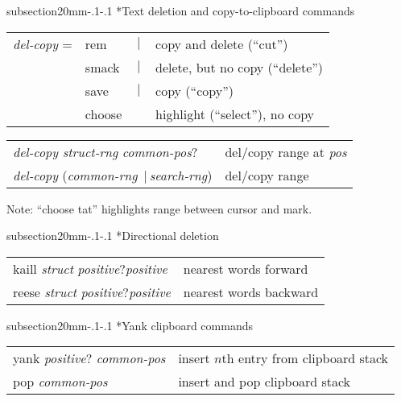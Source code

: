 \documentclass[twocolumn,10pt]{article}
\makeatletter
\renewcommand{\subsection}{\@startsection
  {subsection}{2}{0mm}{-.1\baselineskip}{-.1\baselineskip}%
  {\normalfont\bfseries}}
\newcommand{\myadjust}{\vspace{-.2ex}}
\newcommand{\vbar}{$\,|\,$}
\newcommand{\opt}{$?$}
\newcommand{\cmd}{\sffamily\upshape}
\newcommand{\cat}[1]{\textrm{\textit{#1}}}
\newenvironment{mycenter}
{\begin{trivlist}\item \begin{footnotesize}}
{\end{footnotesize}\end{trivlist}}
\makeatother
\begin{document}
\subsection*{Text deletion and copy-to-clipboard commands}
\myadjust
\begin{mycenter}
\begin{tabular}{llll}
\cat{del-copy} = & \cmd rem & \vbar & copy and delete (``cut'')\\
& \cmd smack  &\vbar & delete, but no copy (``delete'')\\
& \cmd save &\vbar & copy (``copy'')\\
& \cmd choose  &  & highlight (``select''), no copy
\end{tabular}
\end{mycenter}
\myadjust
\begin{mycenter}
\begin{tabular}{l l}
\cat{del-copy struct-rng} \cat{common-pos}? &  del/copy
range at \cat{pos}\\
\cat{del-copy} (\cat{common-rng} \vbar \cat{search-rng}) &
del/copy range\\
\end{tabular}
\end{mycenter}
\begin{footnotesize}
Note: ``choose tat'' highlights range between cursor and mark.
\end{footnotesize}
\subsection*{Directional deletion}

\begin{mycenter}
  \begin{tabular}{ll}
   \cmd kaill \cat{struct} \cat{positive}\opt \cat{positive} & nearest words forward \\
   \cmd reese \cat{struct} \cat{positive}\opt \cat{positive} & nearest words backward \\
  \end{tabular}
\end{mycenter}

\subsection*{Yank clipboard commands}

\begin{mycenter}
  \begin{tabular}{ll}
   \cmd yank \cat{positive}\opt 
   \cat{common-pos} & insert $n$th entry from clipboard stack\\
   \cmd pop \cat{common-pos} & insert and pop clipboard stack\\ 
 \end{tabular}
\end{mycenter}
\end{document}
